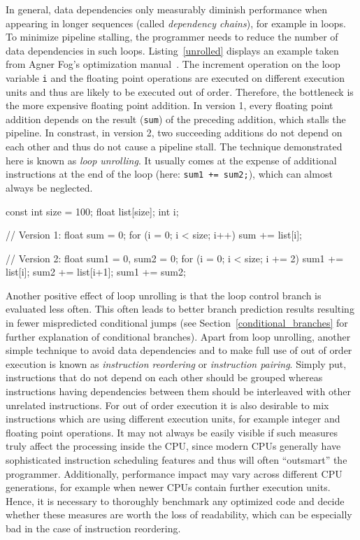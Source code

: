 In general, data dependencies only measurably diminish performance when appearing in longer sequences (called \emph{dependency chains}), for example in loops. To minimize pipeline stalling, the programmer needs to reduce the number of data dependencies in such loops. Listing~\ref{unrolled} displays an example taken from Agner Fog's optimization manual~\cite[p. 103]{fog2011optimizing}. The increment operation on the loop variable \texttt{i} and the floating point operations are executed on different execution units and thus are likely to be executed out of order. Therefore, the bottleneck is the more expensive floating point addition. In version 1, every floating point addition depends on the result (\texttt{sum}) of the preceding addition, which stalls the pipeline. In constrast, in version 2, two succeeding additions do not depend on each other and thus do not cause a pipeline stall. The technique demonstrated here is known as \emph{loop unrolling}. It usually comes at the expense of additional instructions at the end of the loop (here: \texttt{sum1 += sum2;}), which can almost always be neglected.
\begin{code}[caption={Loop unrolling example}, label=unrolled]
const int size = 100;
float list[size]; int i;

// Version 1:
float sum = 0;
for (i = 0; i < size; i++) 
  sum += list[i];

// Version 2:
float sum1 = 0, sum2 = 0;
for (i = 0; i < size; i += 2) {
  sum1 += list[i];
  sum2 += list[i+1];
}
sum1 += sum2;
\end{code}


Another positive effect of loop unrolling is that the loop control branch is evaluated less often. This often leads to better branch prediction results resulting in fewer mispredicted conditional jumps (see Section~\ref{conditional_branches} for further explanation of conditional branches). Apart from loop unrolling, another simple technique to avoid data dependencies and to make full use of out of order execution is known as \emph{instruction reordering} or \emph{instruction pairing}. Simply put, instructions that do not depend on each other should be grouped whereas instructions having dependencies between them should be interleaved with other unrelated instructions. For out of order execution it is also desirable to mix instructions which are using different execution units, for example integer and floating point operations. It may not always be easily visible if such measures truly affect the processing inside the CPU, since modern CPUs generally have sophisticated instruction scheduling features and thus will often ``outsmart'' the programmer. Additionally, performance impact may vary across different CPU generations, for example when newer CPUs contain further execution units. Hence, it is necessary to thoroughly benchmark any optimized code and decide whether these measures are worth the loss of readability, which can be especially bad in the case of instruction reordering.

